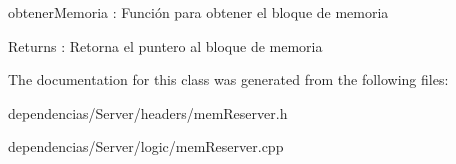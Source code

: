 obtener\+Memoria \+: Función para obtener el bloque de memoria 

\begin{DoxyReturn}{Returns}
\+: Retorna el puntero al bloque de memoria 
\end{DoxyReturn}


The documentation for this class was generated from the following files\+:\begin{DoxyCompactItemize}
\item 
dependencias/\+Server/headers/mem\+Reserver.\+h\item 
dependencias/\+Server/logic/mem\+Reserver.\+cpp\end{DoxyCompactItemize}
